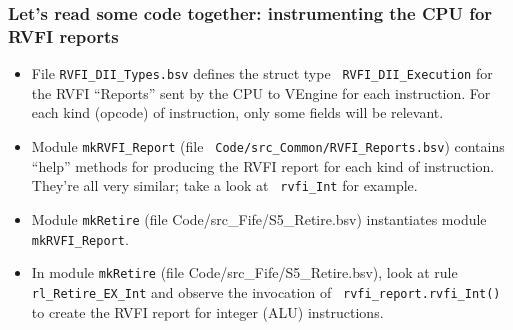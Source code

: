 
\begin{frame}[fragile]
\frametitle{Let's read some code together: instrumenting the CPU for RVFI reports}

\begin{center}\scriptsize

 \vspace*{5ex}
 
 \begin{minipage}{0.9\textwidth}
  \begin{itemize}

    \item File {\tt RVFI\_DII\_Types.bsv} defines the struct type {\tt
          RVFI\_DII\_Execution} for the RVFI ``Reports'' sent by the
          CPU to VEngine for each instruction.  For each kind (opcode)
          of instruction, only some fields will be relevant.

    \vspace*{1ex}

    \item Module {\tt mkRVFI\_Report} ({\tiny file \tt
          Code/src\_Common/RVFI\_Reports.bsv}) contains ``help''
          methods for producing the RVFI report for each kind of
          instruction.  They're all very similar; take a look at {\tt
          rvfi\_Int} for example.

    \vspace*{1ex}

    \item Module {\tt mkRetire} ({\tiny file
        Code/src\_Fife/S5\_Retire.bsv}) instantiates module {\tt
        mkRVFI\_Report}.

    \vspace*{1ex}

    \item In module {\tt mkRetire} ({\tiny file
        Code/src\_Fife/S5\_Retire.bsv}), look at rule {\tt
        rl\_Retire\_EX\_Int} and observe the invocation of {\tt
        rvfi\_report.rvfi\_Int()} to create the RVFI report for
        integer (ALU) instructions.

  \end{itemize}
 \end{minipage}
\end{center}

\end{frame}

